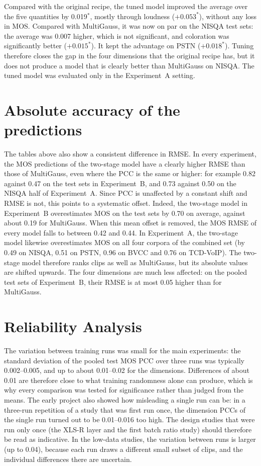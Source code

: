 \documentclass[
english,                 %
bibtex,                  %
includeExtraAbstracts, %
]{kththesis}
\numberwithin{listing}{chapter}
\begin{document}
Compared with the original recipe, the tuned model improved the average over the five quantities by 0.019$^{*}$, mostly through loudness ($+0.053^{*}$), without any loss in MOS. Compared with MultiGauss, it was now on par on the NISQA test sets: the average was 0.007 higher, which is not significant, and coloration was significantly better ($+0.015^{*}$). It kept the advantage on PSTN ($+0.018^{*}$). Tuning therefore closes the gap in the four dimensions that the original recipe has, but it does not produce a model that is clearly better than MultiGauss on NISQA. The tuned model was evaluated only in the Experiment~A setting.

\section{Absolute accuracy of the predictions}
\label{sec:resultsCalibration}

The tables above also show a consistent difference in RMSE. In every experiment, the MOS predictions of the two-stage model have a clearly higher RMSE than those of MultiGauss, even where the PCC is the same or higher: for example 0.82 against 0.47 on the test sets in Experiment~B, and 0.73 against 0.50 on the NISQA half of Experiment~A. Since PCC is unaffected by a constant shift and RMSE is not, this points to a systematic offset. Indeed, the two-stage model in Experiment~B overestimates MOS on the test sets by 0.70 on average, against about 0.19 for MultiGauss. When this mean offset is removed, the MOS RMSE of every model falls to between 0.42 and 0.44. In Experiment~A, the two-stage model likewise overestimates MOS on all four corpora of the combined set (by 0.49 on NISQA, 0.51 on PSTN, 0.96 on BVCC and 0.76 on TCD-VoIP). The two-stage model therefore ranks clips as well as MultiGauss, but its absolute values are shifted upwards. The four dimensions are much less affected: on the pooled test sets of Experiment~B, their RMSE is at most 0.05 higher than for MultiGauss.

\section{Reliability Analysis}
\label{sec:reliabilityAnalysis}

The variation between training runs was small for the main experiments: the standard deviation of the pooled test MOS PCC over three runs was typically 0.002--0.005, and up to about 0.01--0.02 for the dimensions. Differences of about 0.01 are therefore close to what training randomness alone can produce, which is why every comparison was tested for significance rather than judged from the means. The early project also showed how misleading a single run can be: in a three-run repetition of a study that was first run once, the dimension PCCs of the single run turned out to be 0.01--0.016 too high. The design studies that were run only once (the XLS-R layer and the first batch ratio study) should therefore be read as indicative. In the low-data studies, the variation between runs is larger (up to 0.04), because each run draws a different small subset of clips, and the individual differences there are uncertain.
\end{document}
